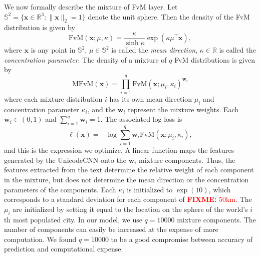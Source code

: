 \documentclass[sigconf,anonymous,review,10pt]{acmart}
\newcommand{\defn}[1]{\textit{#1}}
\newcommand{\trans}[1]{{#1}^{\top}}
\newcommand{\ltwo}[1]{\lVert {#1} \rVert_2}
\newcommand{\w}{\mathbf{w}}
\newcommand{\x}{\mathbf{x}}
\newcommand{\fixme}[1]{\textcolor{red}{\textbf{FIXME:} {#1}}}
\begin{document}
\begin{description}
        We now formally describe the mixture of FvM layer.
        Let $\mathbb{S}^2 = \{ \x \in \mathbb R^3 : \ltwo{\x}=1 \}$ denote the unit sphere.
        Then the density of the FvM distribution is given by
        \begin{equation}
            \text{FvM}(\x;\mu,\kappa) = \frac{\kappa}{\sinh \kappa} \exp(\kappa\trans\mu\x),
        \end{equation}
        where 
        $\x$ is any point in $\mathbb{S}^2$,
        $\mu\in\mathbb{S}^2$ is called the \defn{mean direction},
        $\kappa\in\mathbb R$ is called the \defn{concentration parameter}.
        The density of a mixture of $q$ FvM distributions is given by
        \begin{equation}
            \text{MFvM}(\x) = \prod_{i=1}^q \text{FvM}(\x;\mu_i,\kappa_i)^{\w_i}
        \end{equation}
        where each mixture distribution $i$ has its own mean direction $\mu_i$ and concentration parameter $\kappa_i$, 
        and the $\w_i$ represent the mixture weights.
        Each $\w_i\in(0,1)$ and $\sum_{i=1}^q \w_i = 1$.
        The associated log loss is 
        \begin{equation}
            \ell(\x) = -\log\sum_{i=1}^q {\w}_i \text{FvM}(\x;\mu_i,\kappa_i),
        \end{equation}
        and this is the expression we optimize.
        A linear function maps the features generated by the UnicodeCNN onto the $\w_i$ mixture components.
        Thus, the features extracted from the text determine the relative weight of each component in the mixture,
        but does not determine the mean direction or the concentration parameters of the components.
        Each $\kappa_i$ is initialized to $\exp(10)$,
        which corresponds to a standard deviation for each component of \fixme{50km}.
        The $\mu_i$ are initialized by setting it equal to the location on the sphere of the world's $i$th most populated city.
        In our model, we use $q=10000$ mixture components. 
        The number of components can easily be increased at the expense of more computation.
        We found $q=10000$ to be a good compromise between accuracy of prediction and computational expense.


\end{description}
\end{document}
